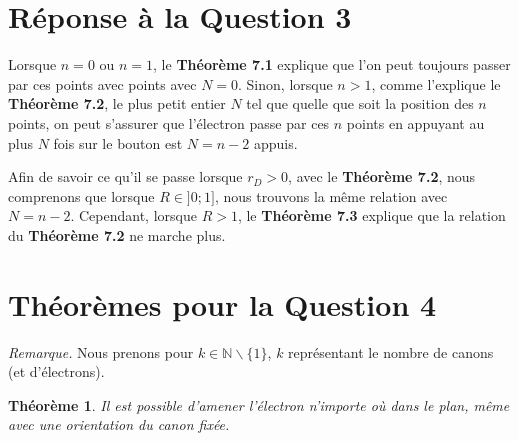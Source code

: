 \documentclass[a4paper]{amsart}
\newtheorem{theorem}{Théorème}[section]
\theoremstyle{definition}
\theoremstyle{remark}
\numberwithin{equation}{section}
\begin{document}
\section{Réponse à la Question 3}

Lorsque $n=0$ ou $n=1$, le \textbf{Théorème 7.1} explique que l'on peut toujours passer par ces points avec points avec $N=0$.
Sinon, lorsque $n>1$, comme l'explique le \textbf{Théorème 7.2}, le plus petit entier $N$ tel que quelle que soit la position des $n$ points, on peut s’assurer que l’électron passe par ces $n$ points en appuyant
au plus $N$ fois sur le bouton est $N=n-2$ appuis. 

Afin de savoir ce qu'il se passe lorsque $r_D>0$, avec le \textbf{Théorème 7.2}, nous comprenons que lorsque $R\in]0;1]$, nous trouvons la même relation avec $N=n-2$. Cependant, lorsque $R>1$, le \textbf{Théorème 7.3} 
explique que la relation du \textbf{Théorème 7.2} ne marche plus.

\section{Théorèmes pour la Question 4}

\textit{Remarque.} Nous prenons pour $k\in\mathbb{N}\backslash\lbrace{1}\rbrace$, $k$ représentant le nombre de canons (et d'électrons).

\begin{theorem}
  Il est possible d'amener l'électron n'importe où dans le plan, même avec une orientation du canon fixée.
\end{theorem}
\end{document}

